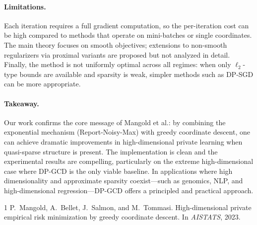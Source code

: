 \documentclass[11pt,a4paper]{article}
\begin{document}
\paragraph{Limitations.}
Each iteration requires a full gradient computation, so the per-iteration cost can be high compared to methods that operate on mini-batches or single coordinates. The main theory focuses on smooth objectives; extensions to non-smooth regularizers via proximal variants are proposed but not analyzed in detail. Finally, the method is not uniformly optimal across all regimes: when only $\ell_2$-type bounds are available and sparsity is weak, simpler methods such as DP-SGD can be more appropriate.

\paragraph{Takeaway.}
Our work confirms the core message of Mangold et al.: by combining the exponential mechanism (Report-Noisy-Max) with greedy coordinate descent, one can achieve dramatic improvements in high-dimensional private learning when quasi-sparse structure is present. The implementation is clean and the experimental results are compelling, particularly on the extreme high-dimensional case where DP-GCD is the only viable baseline. In applications where high dimensionality and approximate sparsity coexist—such as genomics, NLP, and high-dimensional regression—DP-GCD offers a principled and practical approach.

\begin{thebibliography}{1}
P.~Mangold, A.~Bellet, J.~Salmon, and M.~Tommasi.
\newblock High-dimensional private empirical risk minimization by greedy
  coordinate descent.
\newblock In \emph{AISTATS}, 2023.
\end{thebibliography}
\end{document}
